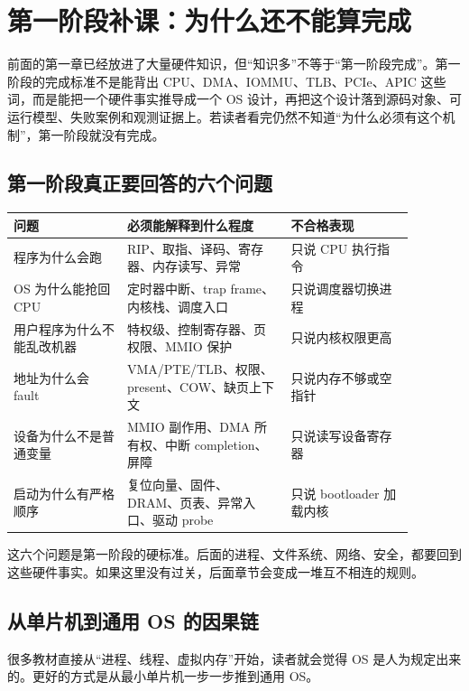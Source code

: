 \section{第一阶段补课：为什么还不能算完成}

前面的第一章已经放进了大量硬件知识，但“知识多”不等于“第一阶段完成”。第一阶段的完成标准不是能背出 CPU、DMA、IOMMU、TLB、PCIe、APIC 这些词，而是能把一个硬件事实推导成一个 OS 设计，再把这个设计落到源码对象、可运行模型、失败案例和观测证据上。若读者看完仍然不知道“为什么必须有这个机制”，第一阶段就没有完成。

\subsection{第一阶段真正要回答的六个问题}

\begin{longtable}{p{0.25\linewidth}p{0.36\linewidth}p{0.27\linewidth}}
\toprule
问题 & 必须能解释到什么程度 & 不合格表现 \\
\midrule
程序为什么会跑 & RIP、取指、译码、寄存器、内存读写、异常 & 只说 CPU 执行指令 \\
OS 为什么能抢回 CPU & 定时器中断、trap frame、内核栈、调度入口 & 只说调度器切换进程 \\
用户程序为什么不能乱改机器 & 特权级、控制寄存器、页权限、MMIO 保护 & 只说内核权限更高 \\
地址为什么会 fault & VMA/PTE/TLB、权限、present、COW、缺页上下文 & 只说内存不够或空指针 \\
设备为什么不是普通变量 & MMIO 副作用、DMA 所有权、中断 completion、屏障 & 只说读写设备寄存器 \\
启动为什么有严格顺序 & 复位向量、固件、DRAM、页表、异常入口、驱动 probe & 只说 bootloader 加载内核 \\
\bottomrule
\end{longtable}

这六个问题是第一阶段的硬标准。后面的进程、文件系统、网络、安全，都要回到这些硬件事实。如果这里没有过关，后面章节会变成一堆互不相连的规则。

\subsection{从单片机到通用 OS 的因果链}

很多教材直接从“进程、线程、虚拟内存”开始，读者就会觉得 OS 是人为规定出来的。更好的方式是从最小单片机一步一步推到通用 OS。

